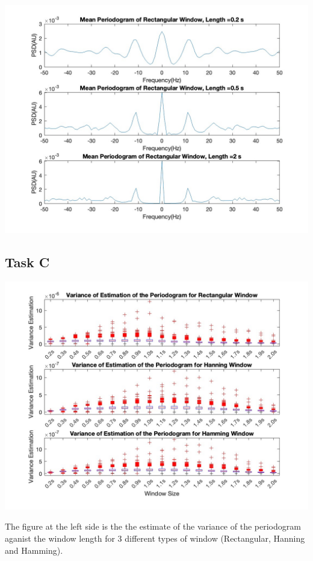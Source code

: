 \documentclass[8pt]{article}  %
\theoremstyle{plain}
\theoremstyle{definition}
\theoremstyle{remark}
\begin{document}
    \hfill
    \begin{minipage}{0.5\textwidth}
        \centering
        \includegraphics[width=\linewidth]{figure/figure5.jpg}
    \end{minipage}

    \subsection{Task C}
    \begin{minipage}{0.5\textwidth}
        \centering
        \includegraphics[width=\linewidth]{figure/figure6.jpg}
    \end{minipage}
    \begin{minipage}{0.48\textwidth}
    The figure at the left side is the the estimate of the variance of the 
    periodogram aganist the window length for 3 different types of window
    (Rectangular, Hanning and Hamming).

    \vspace{0.15cm}

    
    \end{minipage}
\end{document}
